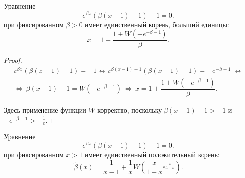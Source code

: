 \begin{lemma}
\label{lm:tau_star_sol}
Уравнение 
\begin{equation}
	e^{\beta x}(\beta(x - 1) - 1) + 1 = 0.
\end{equation}
при фиксированном $\beta > 0$ имеет единственный корень, больший единицы:
\begin{equation}
	x = 1 + \frac{1 + W(-e^{-\beta - 1})}{\beta}.
\end{equation}
\end{lemma}
\begin{proof}

\begin{multline*}
	e^{\beta x}(\beta(x - 1) - 1) = -1 \Leftrightarrow e^{\beta(x - 1) - 1}(\beta(x - 1) - 1) = -e^{-\beta - 1}\ \Leftrightarrow\\\Leftrightarrow\ \beta(x - 1) - 1 = W(-e^{-\beta - 1})\ \Leftrightarrow\ x = 1 + \dfrac{1 + W(-e^{-\beta - 1})}{\beta}.
\end{multline*}

Здесь применение функции $W$ корректно, поскольку $\beta(x - 1) - 1 > -1$ и $-e^{-\beta - 1} > -\frac{1}{e}$.

\end{proof}


\begin{lemma}
	\label{lm:beta_tilde_sol}
	Уравнение 
	\begin{equation*}
		e^{\beta x}(\beta(x - 1) - 1) + 1 = 0.
	\end{equation*}
	при фиксированном $x > 1$ имеет единственный положительный корень:
	\begin{equation*}
		\tilde{\beta}(x) = \frac{1}{x - 1} + \frac{1}{x}W\left(\frac{x}{1 - x} e^{\frac{x}{1 - x}}\right).
	\end{equation*}
\end{lemma}

